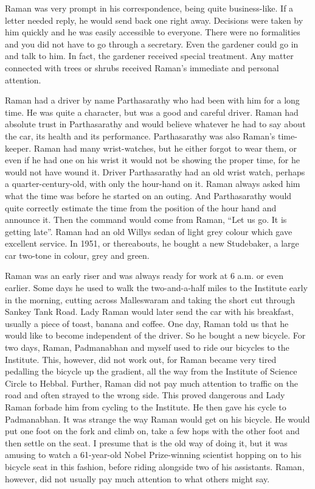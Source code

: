Raman was very prompt in his correspondence, being quite
busi\-ness-like. If a letter needed reply, he would send back one
right away. Decisions were taken by him quickly and he was easily
accessible to everyone. There were no formalities and you did
not have to go through a secretary. Even the gardener could go
in and talk to him. In fact, the gardener received special treatment.
Any matter connected with trees or shrubs received Raman's
immediate and personal attention.

Raman had a driver by name Parthasarathy who had been
with him for a long time. He was quite a character, but was a
good and careful driver. Raman had absolute trust in
Partha\-sarathy and would believe whatever he had to say about
the car, its health and its performance. Parthasarathy was also
Raman's time-keeper. Raman had many wrist-watches, but he
either forgot to wear them, or even if he had one on his wrist
it would not be showing the proper time, for he would not have
wound it. Driver Parthasarathy had an old wrist watch, perhaps
a quarter-century-old, with only the hour-hand on it. Raman
always asked him what the time was before he started on an
outing. And Parthasarathy would quite correctly estimate the time
from the position of the hour hand and announce it. Then the
command would come from Raman, ``Let us go. It is getting
late''. Raman had an old Willys sedan of light grey colour which
gave excellent service. In 1951, or thereabouts, he bought a new
Studebaker, a large car two-tone in colour, grey and green.

Raman was an early riser and was always ready for work
at 6 a.m. or even earlier. Some days he used to walk the two-and-a-half miles
to the Institute early in the morning, cutting across Malleswaram
and taking the short cut through Sankey Tank Road. Lady Raman
would later send the car with his breakfast, usually a piece of
toast, banana and coffee. One day, Raman told us that he would
like to become independent of the driver. So he bought a new
bicycle. For two days, Raman, Padmanabhan and myself used
to ride our bicycles to the Institute. This, however, did not work
out, for Raman became very tired pedalling the bicycle up the
gradient, all the way from the Institute of Science Circle to
Hebbal. Further, Raman did not pay much attention to traffic
on the road and often strayed to the wrong side. This proved
dangerous and Lady Raman forbade him from cycling to
the Institute. He then gave his cycle to Padmanabhan. It was
strange the way Raman would get on his bicycle. He would put
one foot on the fork and climb on, take a few hops with the
other foot and then settle on the seat. I presume that is the old
way of doing it, but it was amusing to watch a 61-year-old
Nobel Prize-winning scientist hopping on to his bicycle seat in
this fashion, before riding alongside two of his assistants. Raman,
however, did not usually pay much attention to what others
might say.

